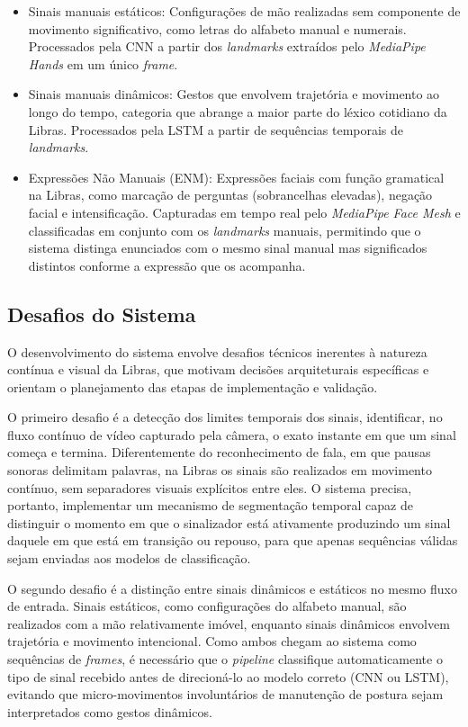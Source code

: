 \documentclass[
    12pt,                %
    openright,           %
    oneside,             %
    a4paper,             %
    english,             %
    brazil               %
]{abntex2}
\begin{document}
\begin{itemize}
    \item Sinais manuais estáticos: Configurações de mão realizadas sem componente de movimento significativo, como letras do alfabeto manual e numerais. Processados pela CNN a partir dos \textit{landmarks} extraídos pelo \textit{MediaPipe Hands} em um único \textit{frame}.
    \item Sinais manuais dinâmicos: Gestos que envolvem trajetória e movimento ao longo do tempo, categoria que abrange a maior parte do léxico cotidiano da Libras. Processados pela LSTM a partir de sequências temporais de \textit{landmarks}.
    \item Expressões Não Manuais (ENM): Expressões faciais com função gramatical na Libras, como marcação de perguntas (sobrancelhas elevadas), negação facial e intensificação. Capturadas em tempo real pelo \textit{MediaPipe Face Mesh} e classificadas em conjunto com os \textit{landmarks} manuais, permitindo que o sistema distinga enunciados com o mesmo sinal manual mas significados distintos conforme a expressão que os acompanha.
\end{itemize}

\subsection{Desafios do Sistema}
O desenvolvimento do sistema envolve desafios técnicos inerentes à natureza contínua e visual da Libras, que motivam decisões arquiteturais específicas e orientam o planejamento das etapas de implementação e validação.

O primeiro desafio é a detecção dos limites temporais dos sinais, identificar, no fluxo contínuo de vídeo capturado pela câmera, o exato instante em que um sinal começa e termina. Diferentemente do reconhecimento de fala, em que pausas sonoras delimitam palavras, na Libras os sinais são realizados em movimento contínuo, sem separadores visuais explícitos entre eles. O sistema precisa, portanto, implementar um mecanismo de segmentação temporal capaz de distinguir o momento em que o sinalizador está ativamente produzindo um sinal daquele em que está em transição ou repouso, para que apenas sequências válidas sejam enviadas aos modelos de classificação.

O segundo desafio é a distinção entre sinais dinâmicos e estáticos no mesmo fluxo de entrada. Sinais estáticos, como configurações do alfabeto manual, são realizados com a mão relativamente imóvel, enquanto sinais dinâmicos envolvem trajetória e movimento intencional. Como ambos chegam ao sistema como sequências de \textit{frames}, é necessário que o \textit{pipeline} classifique automaticamente o tipo de sinal recebido antes de direcioná-lo ao modelo correto (CNN ou LSTM), evitando que micro-movimentos involuntários de manutenção de postura sejam interpretados como gestos dinâmicos.
\end{document}
